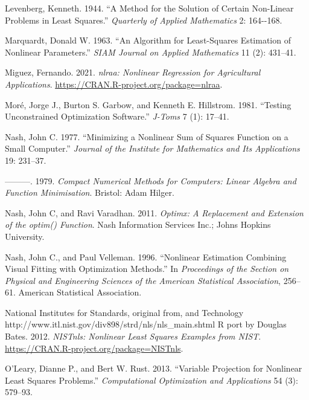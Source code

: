 \begin{CSLReferences}{1}{0}
\leavevmode{}%
Levenberg, Kenneth. 1944. {``A Method for the Solution of Certain Non-Linear Problems in Least Squares.''} \emph{Quarterly of Applied Mathematics} 2: 164-\/-168.

\leavevmode{}%
Marquardt, Donald W. 1963. {``{An Algorithm for Least-Squares Estimation of Nonlinear Parameters}.''} \emph{SIAM Journal on Applied Mathematics} 11 (2): 431--41.

\leavevmode{}%
Miguez, Fernando. 2021. \emph{{nlraa: Nonlinear Regression for Agricultural Applications}}. \url{https://CRAN.R-project.org/package=nlraa}.

\leavevmode{}%
Moré, Jorge J., Burton S. Garbow, and Kenneth E. Hillstrom. 1981. {``Testing Unconstrained Optimization Software.''} \emph{J-Toms} 7 (1): 17--41.

\leavevmode{}%
Nash, John C. 1977. {``Minimizing a Nonlinear Sum of Squares Function on a Small Computer.''} \emph{Journal of the Institute for Mathematics and Its Applications} 19: 231--37.

\leavevmode{}%
---------. 1979. \emph{Compact Numerical Methods for Computers: Linear Algebra and Function Minimisation}. Bristol: Adam Hilger.

\leavevmode{}%
Nash, John C, and Ravi Varadhan. 2011. \emph{\emph{Optimx}: A Replacement and Extension of the {optim()} Function}. Nash Information Services Inc.; Johns Hopkins University.

\leavevmode{}%
Nash, John C., and Paul Velleman. 1996. {``Nonlinear Estimation Combining Visual Fitting with Optimization Methods.''} In \emph{Proceedings of the Section on Physical and Engineering Sciences of the American Statistical Association}, 256--61. American Statistical Association.

\leavevmode{}%
National Institutes for Standards, original from, and Technology http://www.itl.nist.gov/div898/strd/nls/nls\_main.shtml R port by Douglas Bates. 2012. \emph{NISTnls: Nonlinear Least Squares Examples from NIST}. \url{https://CRAN.R-project.org/package=NISTnls}.

\leavevmode{}%
O'Leary, Dianne P., and Bert W. Rust. 2013. {``Variable Projection for Nonlinear Least Squares Problems.''} \emph{Computational Optimization and Applications} 54 (3): 579--93.


\end{CSLReferences}
